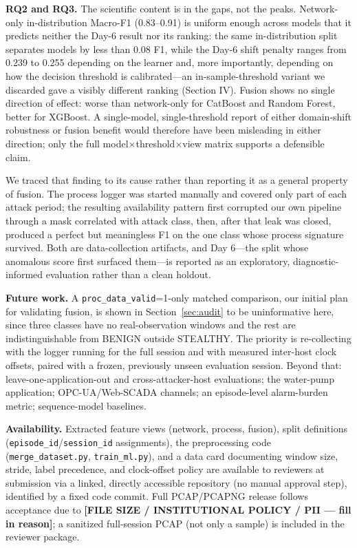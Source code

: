 \documentclass[conference]{IEEEtran}
\begin{document}
\textbf{RQ2 and RQ3.} The scientific content is in the gaps, not the peaks. Network-only in-distribution
Macro-F1 (0.83--0.91) is uniform enough across models that it predicts neither the Day-6 result nor its
ranking: the same in-distribution split separates models by less than 0.08 F1, while the Day-6 shift
penalty ranges from 0.239 to 0.255 depending on the learner and, more importantly, depending on how the
decision threshold is calibrated---an in-sample-threshold variant we discarded gave a visibly different
ranking (Section IV). Fusion shows no single direction of effect: worse than network-only for CatBoost
and Random Forest, better for XGBoost. A single-model, single-threshold report of either domain-shift
robustness or fusion benefit would therefore have been misleading in either direction; only the full
model$\times$threshold$\times$view matrix supports a defensible claim.

We traced that finding to its cause rather than reporting it as a general property of fusion. The process
logger was started manually and covered only part of each attack period; the resulting availability
pattern first corrupted our own pipeline through a mask correlated with attack class, then, after that
leak was closed, produced a perfect but meaningless F1 on the one class whose process signature survived.
Both are data-collection artifacts, and Day 6---the split whose anomalous score first surfaced
them---is reported as an exploratory, diagnostic-informed evaluation rather than a clean holdout.

\textbf{Future work.} A \texttt{proc\_data\_valid}=1-only matched comparison, our initial plan for
validating fusion, is shown in Section~\ref{sec:audit} to be uninformative here, since three classes have
no real-observation windows and the rest are indistinguishable from BENIGN outside STEALTHY. The priority
is re-collecting with the logger running for the full session and with measured inter-host clock offsets,
paired with a frozen, previously unseen evaluation session. Beyond that: leave-one-application-out and
cross-attacker-host evaluations; the water-pump application; OPC-UA/Web-SCADA channels; an episode-level
alarm-burden metric; sequence-model baselines.

\textbf{Availability.} Extracted feature views (network, process, fusion), split definitions
(\texttt{episode\_id}/\texttt{session\_id} assignments), the preprocessing code
(\texttt{merge\_dataset.py}, \texttt{train\_ml.py}), and a data card documenting window size, stride,
label precedence, and clock-offset policy are available to reviewers at submission via a linked, directly
accessible repository (no manual approval step), identified by a fixed code commit. Full PCAP/PCAPNG
release follows acceptance due to \textbf{[FILE SIZE / INSTITUTIONAL POLICY / PII --- fill in reason]};
a sanitized full-session PCAP (not only a sample) is included in the reviewer package.
\end{document}
